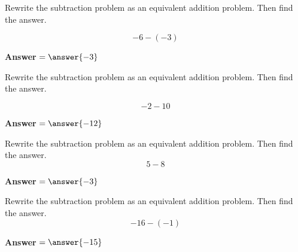\documentclass{ximera}[font=12pt]
\begin{document}
\begin{problem}
Rewrite the subtraction problem as an equivalent addition problem.  Then find the answer.

\[ -6 - (-3) \]

\begin{multipleChoice}
\end{multipleChoice}


\textcolor{accessibleOrange}{\textbf{Answer}}  $ = \answer{-3}$

\end{problem}


\begin{problem}
Rewrite the subtraction problem as an equivalent addition problem.  Then find the answer.

\[ -2 - 10 \]

\begin{multipleChoice}
\end{multipleChoice}

\textcolor{accessibleOrange}{\textbf{Answer}} $ = \answer{-12}$

\end{problem}

\begin{problem} 
Rewrite the subtraction problem as an equivalent addition problem. Then find the answer. 
\[ 5 - 8 \] 
\begin{multipleChoice} 
\end{multipleChoice} 

\textcolor{accessibleOrange}{\textbf{Answer}} $ = \answer{-3}$ 
\end{problem}

\begin{problem} 
Rewrite the subtraction problem as an equivalent addition problem. Then find the answer. 
\[ -16 - (-1) \] 
\begin{multipleChoice} 
\end{multipleChoice} 

\textcolor{accessibleOrange}{\textbf{Answer}} $ = \answer{-15}$ 
\end{problem}
\end{document}
